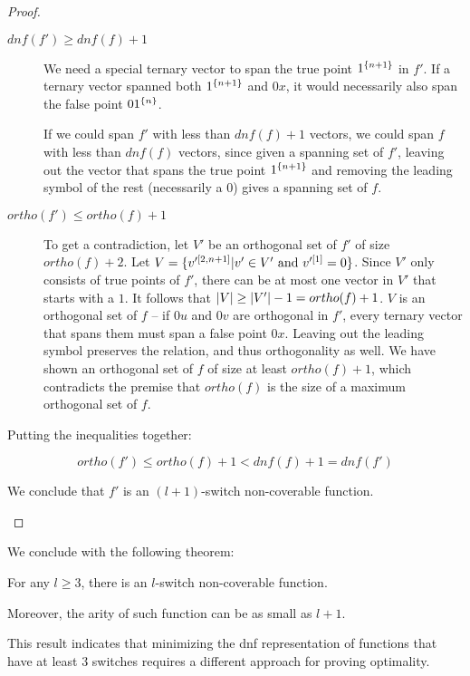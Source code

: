 \begin{proof}
\begin{enumerate}
\begin{description}
\item[$dnf(f') \geq dnf(f) + 1$]
We need a special ternary vector to span the true point
$1^{\{n+1\}}$ in $f'$.
If a ternary vector spanned both $1^{\{n+1\}}$
and $0 x$,
it would necessarily also span the false point
$0 1^{\{n\}}$.

If we could span $f'$ with less than $dnf(f) + 1$ vectors,
we could span $f$ with less than $dnf(f)$ vectors,
since given a spanning set of $f'$,
leaving out the vector
that spans the true point $1^{\{n+1\}}$
and removing the leading symbol of the rest
(necessarily a $0$)
gives a spanning set of $f$.

\item[$ortho(f') \leq ortho(f) + 1$]
To get a contradiction,
let $V'$ be an orthogonal set of $f'$
of size $ortho(f) + 2$.
Let $V = \{v'^{[2, n+1]} | v' \in V'
\text{ and } v'^{[1]} = 0\}$.
Since $V'$ only consists of true points of $f'$,
there can be at most one vector in $V'$
that starts with a $1$.
It follows that
$\lvert V\rvert \geq \lvert V'\rvert - 1 = ortho(f) + 1$.
$V$ is an orthogonal set of $f$ --
if $0 u$ and $0 v$ are orthogonal in $f'$,
every ternary vector that spans them must span
a false point $0 x$.
Leaving out the leading symbol preserves the relation,
and thus orthogonality as well.
We have shown an orthogonal set of $f$ of size at least
$ortho(f) + 1$,
which contradicts the premise that $ortho(f)$ is the size
of a maximum orthogonal set of $f$.
\end{description}

Putting the inequalities together:

\[
ortho(f') \leq ortho(f) + 1 < dnf(f) + 1 = dnf(f')
\]

We conclude that $f'$ is an $(l+1)$-switch non-coverable
function.
\end{enumerate}
\end{proof}

We conclude with the following theorem:

\begin{theorem}
For any $l \geq 3$,
there is an $l$-switch non-coverable function.

Moreover, the arity of such function can be as small as
$l+1$.
\end{theorem}

This result indicates that minimizing the \acrshort{dnf}
representation of functions that have at least $3$ switches
requires a different approach for proving optimality.

